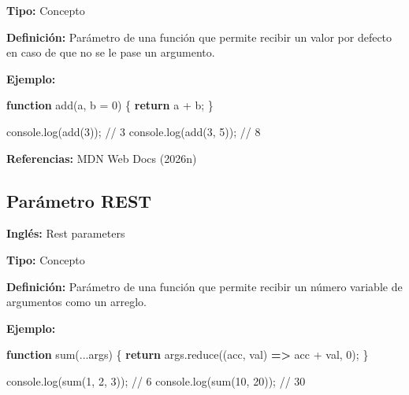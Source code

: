 \documentclass[
  letterpaper,
  DIV=11,
  numbers=noendperiod]{scrreprt}
\newenvironment{Shaded}{\begin{snugshade}}{\end{snugshade}}
\newcommand{\BuiltInTok}[1]{\textcolor[rgb]{0.00,0.23,0.31}{#1}}
\newcommand{\CommentTok}[1]{\textcolor[rgb]{0.37,0.37,0.37}{#1}}
\newcommand{\ControlFlowTok}[1]{\textcolor[rgb]{0.00,0.23,0.31}{\textbf{#1}}}
\newcommand{\DecValTok}[1]{\textcolor[rgb]{0.68,0.00,0.00}{#1}}
\newcommand{\FunctionTok}[1]{\textcolor[rgb]{0.28,0.35,0.67}{#1}}
\newcommand{\KeywordTok}[1]{\textcolor[rgb]{0.00,0.23,0.31}{\textbf{#1}}}
\newcommand{\NormalTok}[1]{\textcolor[rgb]{0.00,0.23,0.31}{#1}}
\newcommand{\OperatorTok}[1]{\textcolor[rgb]{0.37,0.37,0.37}{#1}}
\let\oldsubsection\subsection
\renewcommand{\subsection}{\phantomsection\oldsubsection}
\begin{document}
\textbf{Tipo:} Concepto

\textbf{Definición:} Parámetro de una función que permite recibir un
valor por defecto en caso de que no se le pase un argumento.

\textbf{Ejemplo:}

\begin{Shaded}
\begin{Highlighting}[]
\KeywordTok{function} \FunctionTok{add}\NormalTok{(a}\OperatorTok{,}\NormalTok{ b }\OperatorTok{=} \DecValTok{0}\NormalTok{) \{}
  \ControlFlowTok{return}\NormalTok{ a }\OperatorTok{+}\NormalTok{ b}\OperatorTok{;}
\NormalTok{\}}

\BuiltInTok{console}\OperatorTok{.}\FunctionTok{log}\NormalTok{(}\FunctionTok{add}\NormalTok{(}\DecValTok{3}\NormalTok{))}\OperatorTok{;} \CommentTok{// 3}
\BuiltInTok{console}\OperatorTok{.}\FunctionTok{log}\NormalTok{(}\FunctionTok{add}\NormalTok{(}\DecValTok{3}\OperatorTok{,} \DecValTok{5}\NormalTok{))}\OperatorTok{;} \CommentTok{// 8}
\end{Highlighting}
\end{Shaded}

\textbf{Referencias:} MDN Web Docs (2026n)

\subsection*{Parámetro REST}\label{glos-parametros_rest}

\textbf{Inglés:} Rest parameters

\textbf{Tipo:} Concepto

\textbf{Definición:} Parámetro de una función que permite recibir un
número variable de argumentos como un arreglo.

\textbf{Ejemplo:}

\begin{Shaded}
\begin{Highlighting}[]
\KeywordTok{function} \FunctionTok{sum}\NormalTok{(}\OperatorTok{...}\NormalTok{args) \{}
  \ControlFlowTok{return}\NormalTok{ args}\OperatorTok{.}\FunctionTok{reduce}\NormalTok{((acc}\OperatorTok{,}\NormalTok{ val) }\KeywordTok{=\textgreater{}}\NormalTok{ acc }\OperatorTok{+}\NormalTok{ val}\OperatorTok{,} \DecValTok{0}\NormalTok{)}\OperatorTok{;}
\NormalTok{\}}

\BuiltInTok{console}\OperatorTok{.}\FunctionTok{log}\NormalTok{(}\FunctionTok{sum}\NormalTok{(}\DecValTok{1}\OperatorTok{,} \DecValTok{2}\OperatorTok{,} \DecValTok{3}\NormalTok{))}\OperatorTok{;} \CommentTok{// 6}
\BuiltInTok{console}\OperatorTok{.}\FunctionTok{log}\NormalTok{(}\FunctionTok{sum}\NormalTok{(}\DecValTok{10}\OperatorTok{,} \DecValTok{20}\NormalTok{))}\OperatorTok{;}   \CommentTok{// 30}
\end{Highlighting}
\end{Shaded}
\end{document}
